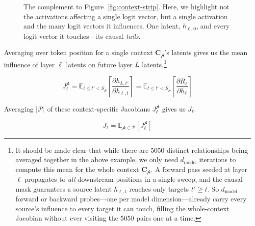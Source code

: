 \documentclass{article}
\newcommand{\logits}{\mathrm{logits}}
\newcommand{\dmodel}{d_{\text{model}}}
\begin{document}
\begin{figure}[htbp]
{}
\caption{The complement to Figure~\ref{fig:context-strip}. Here, we highlight not the activations affecting a single logit vector, but a single activation and the many logit vectors it influences. One latent, $h_{\ell,0}$, and every logit vector it touches---its causal \textit{tails}.}
\label{fig:fan-out}
\end{figure}


Averaging over token position for a single context \(\textbf{C}_{\mathscr{p}}\)'s latents gives us the mean influence of layer \(\ell\) latents on future layer \(L\) latents.\footnote{It should be made clear that while there are 5050 distinct relationships being averaged together in the above example, we only need \(\dmodel\) iterations to compute this mean for the whole context \(\mathbf{C}_{\mathscr{p}}\). A forward pass seeded at layer \(\ell\) propagates to \textit{all} downstream positions in a single sweep, and the causal mask guarantees a source latent \(h_{\ell,t}\) reaches only targets \(t' \ge t\). So \(\dmodel\) forward or backward probes---one per model dimension---already carry every source's influence to every target it can touch, filling the whole-context Jacobian without ever visiting the 5050 pairs one at a time.}

\[J^{\mathscr{p}}_\ell = \mathbb{E}_{t \le t' < S_{\mathscr{p}}}\left[\frac{\partial h_{L,t'}}{\partial h_{\ell,t}}\right] = \mathbb{E}_{t \le t' < S_{\mathscr{p}}}\left[\frac{\partial R_\ell}{\partial h_{\ell}}\right]\]

Averaging \(|\mathscr{P}|\) of these context-specific Jacobians \(J^{\mathscr{p}}_\ell\) gives us \(J_\ell\).

\[J_\ell = \mathbb{E}_{\mathscr{p} \in \mathscr{P}}\left[J^{\mathscr{p}}_\ell\right]\]
\end{document}
